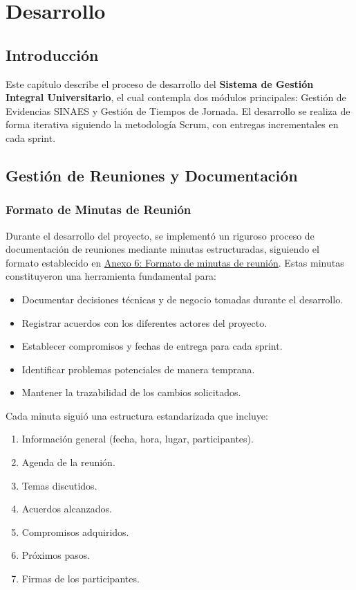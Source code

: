 \chapter{Desarrollo}

\section{Introducción}
Este capítulo describe el proceso de desarrollo del \textbf{Sistema de Gestión Integral Universitario}, el cual contempla dos módulos principales: Gestión de Evidencias SINAES y Gestión de Tiempos de Jornada. El desarrollo se realiza de forma iterativa siguiendo la metodología Scrum, con entregas incrementales en cada sprint.

\section{Gestión de Reuniones y Documentación}

\subsection{Formato de Minutas de Reunión}
Durante el desarrollo del proyecto, se implementó un riguroso proceso de documentación de reuniones mediante minutas estructuradas, siguiendo el formato establecido en \hyperref[anexo:formato_minutas]{Anexo 6: Formato de minutas de reunión}. Estas minutas constituyeron una herramienta fundamental para:

\begin{itemize}
    \item Documentar decisiones técnicas y de negocio tomadas durante el desarrollo.
    \item Registrar acuerdos con los diferentes actores del proyecto.
    \item Establecer compromisos y fechas de entrega para cada sprint.
    \item Identificar problemas potenciales de manera temprana.
    \item Mantener la trazabilidad de los cambios solicitados.
\end{itemize}

Cada minuta siguió una estructura estandarizada que incluye:
\begin{enumerate}
    \item Información general (fecha, hora, lugar, participantes).
    \item Agenda de la reunión.
    \item Temas discutidos.
    \item Acuerdos alcanzados.
    \item Compromisos adquiridos.
    \item Próximos pasos.
    \item Firmas de los participantes.
\end{enumerate}

